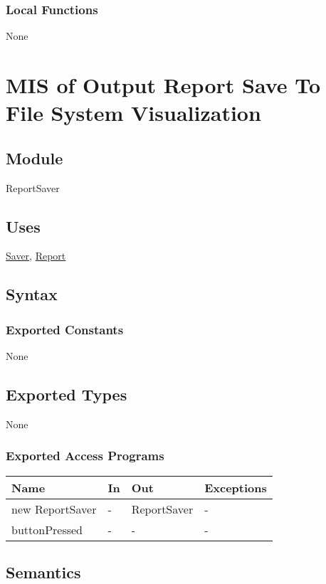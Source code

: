 \documentclass[12pt, titlepage]{article}
\begin{document}
\subsubsection{Local Functions}
None
\newpage
\section{MIS of Output Report Save To File System Visualization} \label{ReportSaver}

\subsection{Module}

ReportSaver

\subsection{Uses}
\hyperref[Saver]{Saver}, \hyperref[Report]{Report}

\subsection{Syntax}

\subsubsection{Exported Constants}
None
\subsection{Exported Types}
None

\subsubsection{Exported Access Programs}
\begin{center}
\begin{tabular}{p{5cm} p{2cm} p{4cm} p{5.5cm}}
\hline
\textbf{Name} & \textbf{In} & \textbf{Out} & \textbf{Exceptions} \\
\hline
new ReportSaver & - & ReportSaver & - \\
\hline
buttonPressed & - & - & - \\
\hline
\end{tabular}
\end{center}

\subsection{Semantics}
\end{document}
